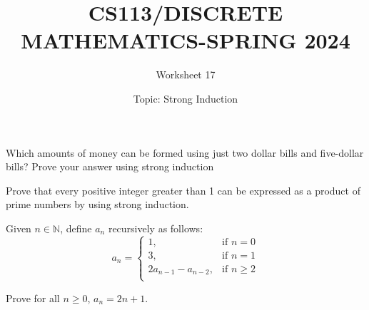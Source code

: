 \documentclass{exam}
\title{CS113/DISCRETE MATHEMATICS-SPRING 2024}
\author{Worksheet 17}
\date{Topic: Strong Induction}
\begin{document}
\maketitle

\begin{center}
\end{center}

\vspace{5mm}

\vspace{5mm}


\vspace{5mm}
\begin{questions}

\question
Which amounts of money can be formed using just two dollar bills and five-dollar bills? Prove your answer using
strong induction
\vspace{9in}

\question Prove that every positive integer greater than 1 can be expressed as a product of prime numbers by using strong induction.
\vspace{9in}

\question 
Given \(n \in \mathbb{N}\), define \(a_{n}\) recursively as follows:
\[
a_{n} = 
\begin{cases}
1, & \text{if } n = 0 \\
3, & \text{if } n = 1 \\
2a_{n-1} - a_{n-2}, & \text{if } n \geq 2 \\
\end{cases}
\]

Prove for all \(n \geq 0\), \(a_{n} = 2n + 1\).



\vspace{9in}


\end{questions}
\end{document}
